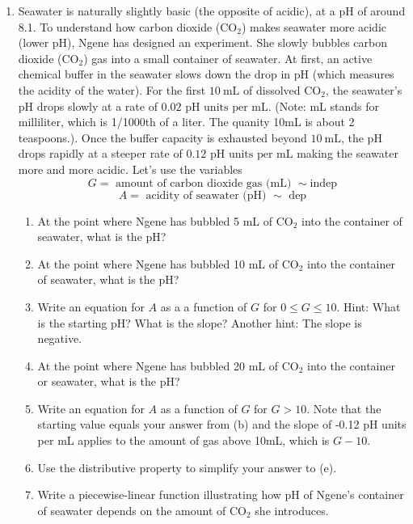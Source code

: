 \begin{enumerate}
\begin{enumerate}
\end{enumerate}

\item Seawater is naturally slightly basic (the opposite of acidic), at a pH of around 8.1.  To understand how carbon dioxide ($\text{CO}_2$) makes seawater more acidic (lower pH), Ngene has designed an experiment.  She slowly bubbles carbon dioxide ($\text{CO}_2$) gas into a small container of seawater.  At first, an active chemical buffer in the seawater slows down the drop in pH (which measures the acidity of the water). For the first $10\ \text{mL}$ of dissolved $\text{CO}_2$, the seawater's pH drops slowly at a rate of $0.02\text{ pH units per mL}$. (Note: mL stands for milliliter, which is 1/1000th of a liter.  The quanity 10mL is about 2 teaspoons.). Once the buffer capacity is exhausted beyond $10\ \text{mL}$, the pH drops rapidly at a steeper rate of $0.12\text{ pH units per mL}$ making the seawater more and more acidic.  Let's use the variables
    $$G = \text{ amount of carbon dioxide gas (mL) } \sim \text{indep}$$
    $$A = \text{ acidity of seawater (pH) } \sim \text{ dep}$$
\begin{enumerate}
    \item At the point where Ngene has bubbled 5 mL of $\text{CO}_2$ into the container of seawater, what is the pH?
    \item At the point where Ngene has bubbled 10 mL of $\text{CO}_2$ into the container of seawater, what is the pH?
    \item Write an equation for $A$ as a a function of $G$ for $0 \le G \le 10$. Hint: What is the starting pH?  What is the slope?  Another hint: The slope is negative.
    \item At the point where Ngene has bubbled 20 mL of $\text{CO}_2$ into the container or seawater, what is the pH?
    \item Write an equation for $A$ as a function of $G$ for $G > 10$.  Note that the starting value equals your answer from (b) and the slope of -0.12 pH units per mL applies to the amount of gas above 10mL, which is $G-10$.
    \item Use the distributive property to simplify your answer to (e).
    \item Write a piecewise-linear function illustrating how pH of Ngene's container of seawater depends on the amount of $\text{CO}_2$ she introduces.
\end{enumerate}


\end{enumerate}
